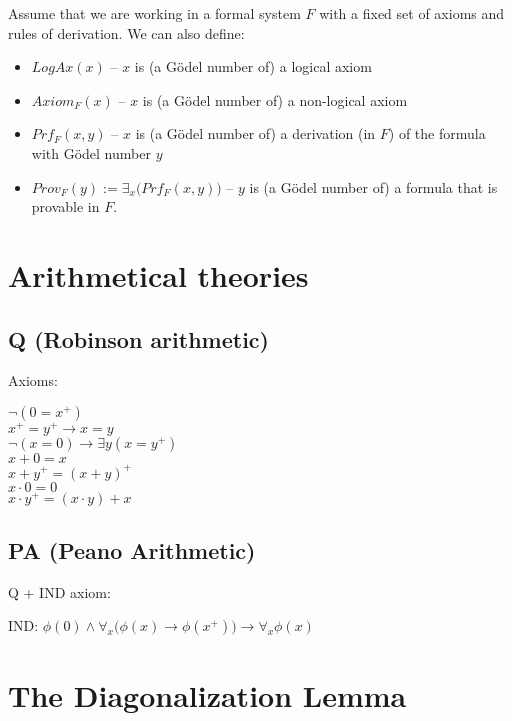 \documentclass{article}
\begin{document}
Assume that we are working in a formal system $F$ with a fixed set of axioms and rules of derivation.
We can also define:

\begin{itemize}
    \item $LogAx(x)$ -- $x$ is (a Gödel number of) a logical axiom
    \item $Axiom_F(x)$ -- $x$ is (a Gödel number of) a non-logical axiom
    \item $Prf_F(x, y)$ -- $x$ is (a Gödel number of) a derivation (in $F$) of the formula with
        Gödel number $y$
    \item $Prov_F(y) := \exists_x \bigl( Prf_F(x, y) \bigl)$ -- $y$ is (a Gödel number of) a formula
        that is provable in $F$.
\end{itemize}

\section{Arithmetical theories}

\subsection{Q (Robinson arithmetic)}

Axioms:
\begin{center}
    $\neg (0 = x^+)$ \\
    $x^+ = y^+ \rightarrow x = y$ \\
    $\neg (x = 0) \rightarrow \exists y (x = y^+)$ \\
    $x + 0 = x$ \\
    $x + y^+ = (x + y)^+$ \\
    $x \cdot 0 = 0$ \\
    $x \cdot y^+ = (x \cdot y) + x$
\end{center}

\subsection{PA (Peano Arithmetic)}

Q + IND axiom:

\begin{center}
    IND: $\phi(0) \land \forall_x \bigl( \phi(x) \rightarrow \phi(x^+) \bigl) \rightarrow \forall_x \phi(x)$
\end{center}

\section{The Diagonalization Lemma}
\end{document}
